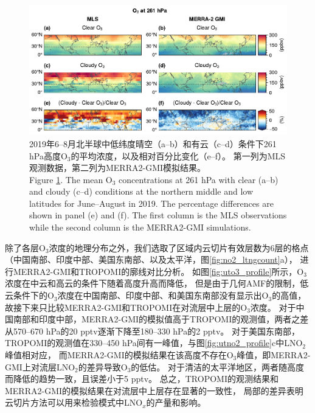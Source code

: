 \begin{figure}[!htbp]
    \centering
    \includegraphics[width=15cm]{./figures/mls_o3_261hpa.pdf}
    \caption{
    2019年6--8月北半球中低纬度晴空（a--b）和有云（c--d）条件下261 hPa高度O$_3$的平均浓度，以及相对百分比变化（e--f）。
    第一列为MLS观测数据，第二列为MERRA2-GMI模拟结果。 \\
    Figure \ref{fig:mls_o3_261hpa}. The mean O$_3$ concentrations at 261 hPa with clear (a--b) and cloudy (c--d) conditions at the northern middle and low latitudes for June--August in 2019. The percentage differences are shown in panel (e) and (f).
    The first column is the MLS observations while the second column is the MERRA2-GMI simulations.
    }
    \label{fig:mls_o3_261hpa}
\end{figure}


除了各层O$_3$浓度的地理分布之外，我们选取了区域内云切片有效层数为6层的格点（中国南部、印度中部、美国东南部、以及太平洋，图\ref{fig:no2_ltngcount}a），
进行MERRA2-GMI和TROPOMI的廓线对比分析。
如图\ref{fig:uto3_profile}所示，O$_3$浓度在中云和高云的条件下随着高度升高而降低，
但是由于几何AMF的限制，低云条件下的O$_3$浓度在中国南部、印度中部、和美国东南部没有显示出O$_3$的高值，故接下来只比较MERRA2-GMI和TROPOMI在对流层中上层的O$_3$浓度。
对于中国南部和印度中部，MERRA2-GMI的模拟值高于TROPOMI的观测值，两者之差从570--670 hPa的20 pptv逐渐下降至180--330 hPa的2 pptv。
对于美国东南部，TROPOMI的观测值在330--450 hPa间有一峰值，与图\ref{fig:utno2_profile}c中LNO$_2$峰值相对应，
而MERRA2-GMI的模拟结果在该高度不存在O$_3$峰值，即MERRA2-GMI上对流层LNO$_2$的差异导致O$_3$的低估。
对于清洁的太平洋地区，两者随高度而降低的趋势一致，且误差小于5 pptv。
总之，TROPOMI的观测结果和MERRA2-GMI的模拟结果在对流层中上层存在显著的一致性，
局部的差异表明云切片方法可以用来检验模式中LNO$_x$的产量和影响。



